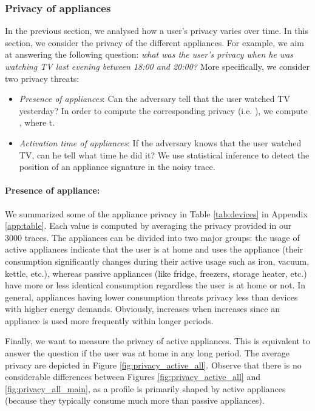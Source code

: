 \documentclass[11pt,a4paper]{article}
\theoremstyle{plain}
\theoremstyle{plain}
\theoremstyle{plain}
\theoremstyle{plain}
\theoremstyle{nonumberplain} \theoremseparator{}
\begin{document}
\subsubsection{Privacy of appliances}
In the previous section, we analysed how a user's privacy  varies over time. In this section, we consider the privacy of the different appliances. For example, we aim at answering the following question: {\em what was the user's privacy when he was watching TV last evening between 18:00 and 20:00?} More specifically, we consider two privacy threats: 
\begin{itemize}
\item \emph{Presence of appliances}: Can the adversary tell that the user watched TV yesterday?
In order to compute the corresponding privacy (i.e. ), we compute , where  t.
\item \emph{Activation time of appliances}: If the adversary knows that the user watched TV, can he tell what time he did it?
We use statistical inference to detect the position of an appliance signature in the noisy trace. 
\end{itemize}

\paragraph{Presence of appliance:} We summarized some of the appliance privacy in Table \ref{tab:devices} in Appendix \ref{app:table}. Each value is computed by averaging the privacy provided in our 3000 traces.
The appliances can be divided into two major groups: the usage of active appliances indicate that the user is at home and uses the appliance (their consumption significantly changes during their active usage such as iron, vacuum, kettle, etc.), whereas passive appliances (like fridge, freezers, storage heater, etc.) have more or less identical consumption regardless the user is at home or not. 
In general, appliances having lower consumption threats privacy less than devices with higher energy demands.  Obviously,  increases when  increases since an appliance is used more frequently within longer periods.

Finally, we want to measure the privacy of active appliances. This is equivalent to answer the question if the user was at home in any  long period. The average privacy are depicted in Figure \ref{fig:privacy_active_all}. Observe that there is no considerable differences between Figures \ref{fig:privacy_active_all} and \ref{fig:privacy_all_main}, as a profile is primarily shaped by active appliances (because they typically consume much more than passive appliances). 
\end{document}
